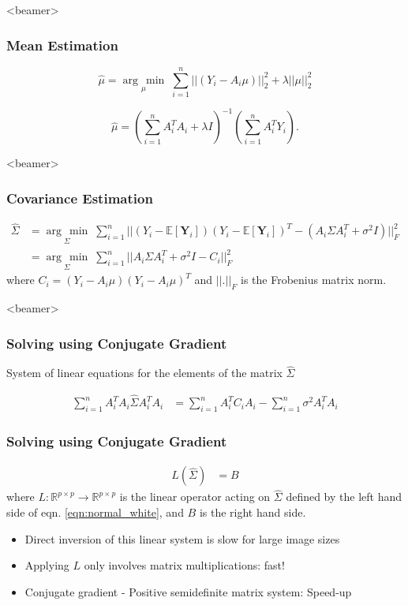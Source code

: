 \documentclass{beamer}
\newcommand{\argmin}[1]{\underset{#1}{\operatorname{arg}\,\operatorname{min}}\;}
\begin{document}

\begin{frame}<beamer>
\frametitle{Mean Estimation}

\begin{equation}
 \hat\mu = \argmin{\mu} \sum_{i=1}^n||(Y_i-A_i\mu)||_2^2 + \lambda||\mu||_2^2
\end{equation}

\begin{equation}
 \hat\mu = (\sum_{i=1}^n A_i^T A_i + \lambda I)^{-1}(\sum_{i=1}^n 
A_i^T Y_i).
\label{eq:ls_mean_sol}
\end{equation}
\end{frame}


\begin{frame}<beamer>
\frametitle{Covariance Estimation}
\begin{equation}
\begin{aligned}
\hat\Sigma 
&= \argmin{\Sigma} \sum_{i=1}^n || (Y_i - \mathbb{E}[\textbf{Y}_i]) (Y_i - \mathbb{E}[\textbf{Y}_i])^T
- (A_i \Sigma A_i^T + \sigma^2 I)||_F^2 \\
&= \argmin{\Sigma} \sum_{i=1}^n || A_i\Sigma A_i^T + \sigma^2 I - C_i  ||_F^2 
\end{aligned}
\label{eqn:ls1}
\end{equation}
where $C_i=(Y_i - A_i \mu) (Y_i - A_i \mu)^T$ and $||.||_F$ is the Frobenius matrix norm. 
\end{frame}


\begin{frame}<beamer>
\frametitle{Solving using Conjugate Gradient}
System of linear equations for the elements of the matrix $\hat \Sigma$

\begin{equation}
\begin{aligned}
\sum_{i=1}^n  A_i^T  A_i \hat \Sigma A_i^T A_i
&= \sum_{i=1}^n A_i^T C_i A_i - \sum_{i=1}^n \sigma^2 A_i^T A_i 
\end{aligned}
\label{eqn:normal_white}
\end{equation}
\frametitle{Solving using Conjugate Gradient}
\begin{equation}
\begin{aligned}
L(\hat\Sigma) 
&=  B 
\label{eqn:cg}
\end{aligned}
\end{equation}
where $L:\mathbb{R}^{p\times p} \to \mathbb{R}^{p\times p}$ is the linear operator acting on $\hat{\Sigma}$ defined by the left hand side of eqn. \ref{eqn:normal_white}, and $B$ is the right hand side.

\begin{itemize}
 \item Direct inversion of this linear system is slow for large image sizes
 \item Applying $L$ only involves matrix multiplications: fast!
 \item Conjugate gradient - \alert{Positive semidefinite matrix system: Speed-up}
\end{itemize}

\end{frame}
\end{document}
